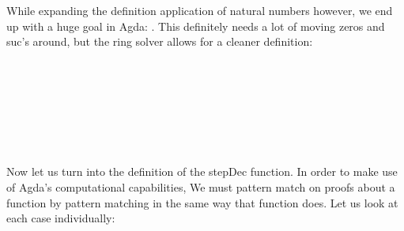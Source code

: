 {While expanding the definition application of natural numbers however, we end up with a huge goal in Agda: . This definitely needs a lot of moving zeros and suc's around, but the ring solver allows for a cleaner definition:

\begin{code}%
\>[0]\<%
\\
\>[0]\<%
\\
\>[0]\<%
\\
\>[0]\<%
\\
\>[0]\<%
\\
\>[0]\<%
\\
\>[0]\AgdaSpace{}%
\AgdaSymbol{=}\AgdaSpace{}%
\AgdaSpace{}%
\AgdaSpace{}%
\AgdaSpace{}%
\AgdaSpace{}%
\AgdaSpace{}%
\AgdaSpace{}%
\AgdaSpace{}%
\AgdaOperator{\AgdaFunction{:*}}\AgdaSpace{}%
\AgdaSymbol{(}\AgdaSpace{}%
\AgdaOperator{\AgdaFunction{:+}}\AgdaSpace{}%
\AgdaSpace{}%
\AgdaSymbol{)}\AgdaSpace{}%
\AgdaOperator{\AgdaFunction{:=}}\AgdaSpace{}%
\AgdaSpace{}%
\AgdaSpace{}%
\AgdaOperator{\AgdaFunction{:+}}\AgdaSpace{}%
\AgdaSpace{}%
\AgdaSpace{}%
\AgdaOperator{\AgdaFunction{:*}}\AgdaSpace{}%
\AgdaSymbol{)}\AgdaSpace{}%
\<%
\end{code}

Now let us turn into the definition of the stepDec function. In order to make use of Agda's computational capabilities, We must pattern match on proofs about a function by pattern matching in the same way that function does. Let us look at each case individually:

}
